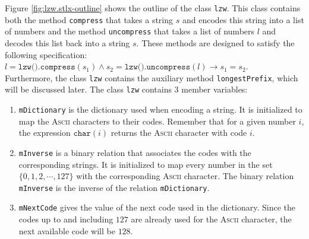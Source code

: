 Figure \ref{fig:lzw.stlx-outline} shows the outline of the class \texttt{lzw}.  This class contains both the
method \texttt{compress} that takes a string $s$ and encodes this string into a list of numbers
and the method \texttt{uncompress} that takes a list of numbers $l$ and decodes this list back into
a string $s$.  These methods are designed to satisfy the following specification:
\\[0.2cm]
\hspace*{1.3cm}
$l = \texttt{lzw().compress}(s_1) \wedge s_2 = \texttt{lzw().uncompress}(l) \rightarrow s_1 = s_2$.
\\[0.2cm]
Furthermore, the class \texttt{lzw} contains the auxiliary method \texttt{longestPrefix}, which will
be discussed later.  The class \texttt{lzw} contains 3 member variables:
\begin{enumerate}
\item \texttt{mDictionary} is the dictionary used when encoding a string.  It is initialized to map
      the \textsc{Ascii} characters to their codes.  Remember that for a given number $i$, the
      expression $\texttt{char}(i)$ returns the \textsc{Ascii} character with code $i$.
\item \texttt{mInverse} is a binary relation that associates the codes with the corresponding
      strings.  It is initialized to map every number in the set $\{ 0, 1, 2, \cdots, 127 \}$
      with the corresponding \textsc{Ascii} character.  The binary relation \texttt{mInverse} is the
      inverse of the relation \texttt{mDictionary}.
\item \texttt{mNextCode} gives the value of the next code used in the dictionary.  Since the codes
      up to and including $127$ are already used for the \textsc{Ascii} character, the next
      available code will be $128$.
\end{enumerate}

